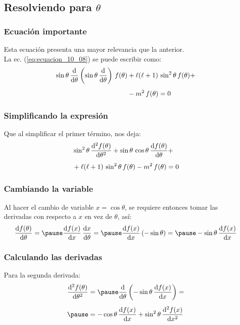 \documentclass[12pt]{beamer}
\begin{document}
\subsection{Resolviendo para \texorpdfstring{$\theta$}{t}}

\begin{frame}
\frametitle{Ecuación importante}
Esta ecuación presenta una mayor relevancia que la anterior.
\\
\bigskip
\pause
La ec. (\ref{eq:ecuacion_10_08}) se puede escribir como:
\pause
\begin{align*}
\sin \theta \, \dv{\theta} \left( \sin \theta \, \dv{\theta} \right) \, f (\theta) &+ \ell (\ell + 1) \, \sin^{2} \theta \, f (\theta) + \\[0.5em] 
&- m^{2} \, f (\theta) = 0
\end{align*}
\end{frame}
\begin{frame}
\frametitle{Simplificando la expresión}
Que al simplificar el primer término, nos deja:
\pause
\begin{align}
\begin{aligned}[b]
&\sin^{2} \theta \, \dv[2]{f (\theta)}{\theta} + \sin \theta \, \cos \theta \, \dv{f ( \theta)}{\theta} + \\[0.5em]
&+\ell (\ell + 1) \, \sin^{2} \theta \, f (\theta) - m^{2} \, f (\theta) = 0
\label{eq:ecuacion_10_11}
\end{aligned}
\end{align}
\end{frame}
\begin{frame}
\frametitle{Cambiando la variable}
Al hacer el cambio de variable $x = \cos \theta$, \pause se requiere entonces tomar las derivadas con respecto a $x$ en vez de $\theta$, así:
\pause
\begin{eqnarray*}
\dv{f (\theta)}{\theta} = \pause \dv{f (x)}{x} \, \dv{x}{\theta} = \pause \dv{f (x)}{x} \, (- \sin \theta) = \pause -\sin \theta \, \dv{f (x)}{x}
\end{eqnarray*}
\end{frame}
\begin{frame}
\frametitle{Calculando las derivadas}
Para la segunda derivada:
\pause
\begin{eqnarray*}
\begin{aligned}
\dv[2]{f (\theta)}{\theta} &= \pause \dv{\theta} \left( -\sin \theta \, \dv{f (x)}{x} \right) = \\[0.5em] \pause
&= - \cos \theta \, \dv{f (x)}{x} + \sin^{2} \theta \, \dv[2]{f (x)}{x}
\end{aligned}
\end{eqnarray*}
\end{frame}
\end{document}
